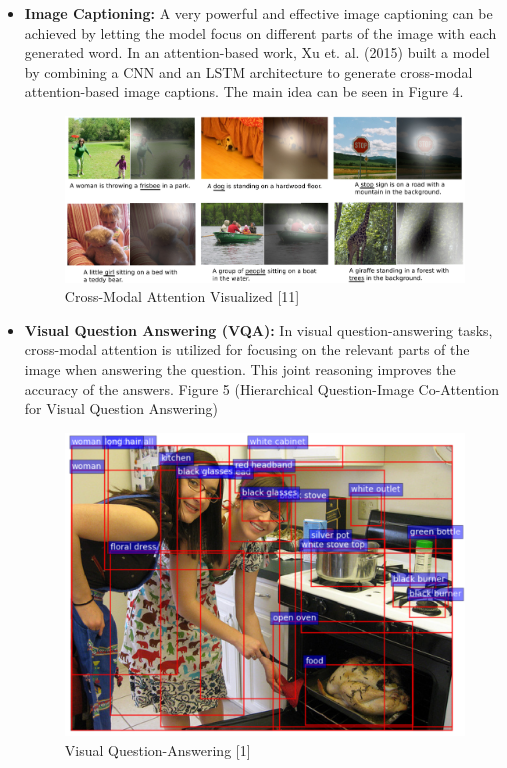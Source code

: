 \documentclass{article}
\begin{document}
\begin{itemize}
    \item \textbf{Image Captioning:} A very powerful and effective image captioning can be achieved by letting the model focus on different parts of the image with each generated word. In an attention-based work, Xu et. al. (2015) built a model by combining a CNN and an LSTM architecture to generate cross-modal attention-based image captions. The main idea can be seen in Figure 4.

\begin{figure}[H]
    \centering
    \includegraphics[width=1\linewidth]{cross_modal_attention.png}
    \caption{Cross-Modal Attention Visualized [11]}
    \label{fig:enter-label}
\end{figure}
    
    \item \textbf{Visual Question Answering (VQA):} In visual question-answering tasks, cross-modal attention is utilized for focusing on the relevant parts of the image when answering the question. This joint reasoning improves the accuracy of the answers. Figure 5 (Hierarchical Question-Image Co-Attention for Visual Question Answering)

\begin{figure}[H]
    \centering
    \includegraphics[width=1\linewidth]{visual_question_answering.png}
    \caption{Visual Question-Answering [1]}
    \label{fig:enter-label}
\end{figure}


\end{itemize}
\end{document}
